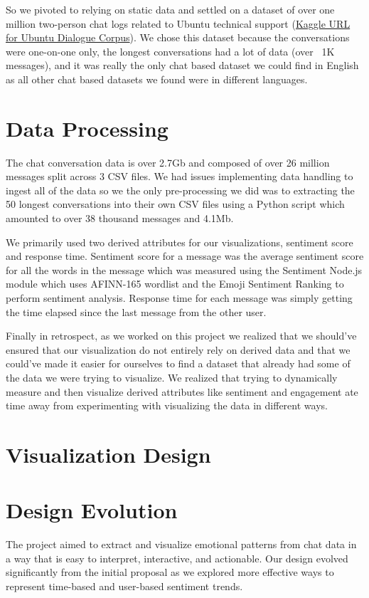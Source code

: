 \documentclass{article}\usepackage{graphicx}
\begin{document}
So we pivoted to relying on static data and settled on a dataset of over one million two-person chat logs related to Ubuntu technical support (\href{https://www.kaggle.com/datasets/rtatman/ubuntu-dialogue-corpus/data}{Kaggle URL for Ubuntu Dialogue Corpus}). We chose this dataset because the conversations were one-on-one only, the longest conversations had a lot of data (over ~1K messages), and it was really the only chat based dataset we could find in English as all other chat based datasets we found were in different languages. 

\section{Data Processing}
The chat conversation data is over 2.7Gb and composed of over 26 million messages split across 3 CSV files. We had issues implementing data handling to ingest all of the data so we the only pre-processing we did was to extracting the 50 longest conversations into their own CSV files using a Python script which amounted to over 38 thousand messages and 4.1Mb. \newline

We primarily used two derived attributes for our visualizations, sentiment score and response time. Sentiment score for a message was the average sentiment score for all the words in the message which was measured using the Sentiment Node.js module which uses AFINN-165 wordlist and the Emoji Sentiment Ranking to perform sentiment analysis. Response time for each message was simply getting the time elapsed since the last message from the other user. 
\newline

Finally in retrospect, as we worked on this project we realized that we should've ensured that our visualization do not entirely rely on derived data and that we could've made it easier for ourselves to find a dataset that already had some of the data we were trying to visualize. We realized that trying to dynamically measure and then visualize derived attributes like sentiment and engagement ate time away from experimenting with visualizing the data in different ways.     

\section{Visualization Design}

\section*{Design Evolution}
The project aimed to extract and visualize emotional patterns from chat data in a way that is easy to interpret, interactive, and actionable. Our design evolved significantly from the initial proposal as we explored more effective ways to represent time-based and user-based sentiment trends.
\end{document}
